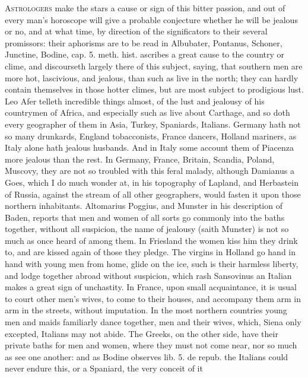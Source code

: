\lettrine{A}{strologers} make the stars a cause or sign of this bitter passion, and
out of every man's horoscope will give a probable conjecture whether he
will be jealous or no, and at what time, by direction of the
significators to their several promissors: their aphorisms are to be
read in Albubater, Pontanus, Schoner, Junctine, \etc{} Bodine, cap. 5.
meth. hist. ascribes a great cause to the country or clime, and
discourseth largely there of this subject, saying, that southern men
are more hot, lascivious, and jealous, than such as live in the north;
they can hardly contain themselves in those hotter climes, but are most
subject to prodigious lust. Leo Afer telleth incredible things almost,
of the lust and jealousy of his countrymen of Africa, and especially
such as live about Carthage, and so doth every geographer of them in
Asia, Turkey, Spaniards, Italians. Germany hath not so many
drunkards, England tobacconists, France dancers, Holland mariners, as
Italy alone hath jealous husbands. And in Italy some account them
of Piacenza more jealous than the rest. In Germany, France,
Britain, Scandia, Poland, Muscovy, they are not so troubled with this
feral malady, although Damianus a Goes, which I do much wonder at, in
his topography of Lapland, and Herbastein of Russia, against the stream
of all other geographers, would fasten it upon those northern
inhabitants. Altomarius Poggius, and Munster in his description of
Baden, reports that men and women of all sorts go commonly into the
baths together, without all suspicion, the name of jealousy (saith
Munster) is not so much as once heard of among them. In Friesland the
women kiss him they drink to, and are kissed again of those they
pledge. The virgins in Holland go hand in hand with young men from
home, glide on the ice, such is their harmless liberty, and lodge
together abroad without suspicion, which rash Sansovinus an Italian
makes a great sign of unchastity. In France, upon small acquaintance,
it is usual to court other men's wives, to come to their houses, and
accompany them arm in arm in the streets, without imputation. In the
most northern countries young men and maids familiarly dance together,
men and their wives, which, Siena only excepted, Italians may not
abide. The Greeks, on the other side, have their private baths
for men and women, where they must not come near, nor so much as see
one another: and as Bodine observes lib. 5. de repub. the
Italians could never endure this, or a Spaniard, the very conceit of it
